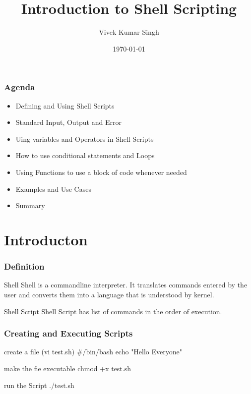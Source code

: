 \documentclass{beamer}
\begin{document}
\title{ Introduction to Shell Scripting } 
\author{Vivek Kumar Singh}
\date{\today}

\begin{frame}
\titlepage
\end{frame}


\begin{frame}\frametitle{ Agenda }

\begin{itemize}
\item Defining and Using Shell Scripts
\item Standard Input, Output and Error
\item Uing variables and Operators in Shell Scripts
\item How to use conditional statements and Loops
\item Using Functions to use a block of code whenever needed
\item Examples and Use Cases
\item Summary
\end{itemize}

\end{frame}

\section{Introducton}
\begin{frame}\frametitle{ Definition }
\begin{block}{ Shell }
Shell is a commandline interpreter. It  translates commands entered by the user and converts them into a language that is understood by kernel.
\end{block}
\pause
\begin{block}{ Shell Script }
Shell Script has list of commands in the order of execution.
\end{block}
\end{frame}

\begin{frame}\frametitle{Creating and Executing Scripts}

\begin{block}{ create a file (vi test.sh) }
\#\!/bin/bash	\newline
echo "Hello Everyone"
\end{block}
\pause
\begin{block}{ make the fie executable }
chmod +x test.sh 
\end{block}
\pause
\begin{block}{ run the Script }
./test.sh
\end{block}

\end{frame}
\end{document}

